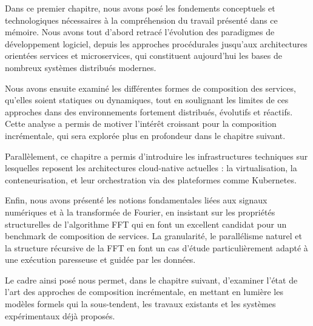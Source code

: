Dans ce premier chapitre, nous avons posé les fondements conceptuels et technologiques nécessaires à la compréhension du travail présenté dans ce mémoire. Nous avons tout d’abord retracé l’évolution des paradigmes de développement logiciel, depuis les approches procédurales jusqu’aux architectures orientées services et microservices, qui constituent aujourd’hui les bases de nombreux systèmes distribués modernes.

Nous avons ensuite examiné les différentes formes de composition des services, qu’elles soient statiques ou dynamiques, tout en soulignant les limites de ces approches dans des environnements fortement distribués, évolutifs et réactifs. Cette analyse a permis de motiver l’intérêt croissant pour la composition incrémentale, qui sera explorée plus en profondeur dans le chapitre suivant.

Parallèlement, ce chapitre a permis d’introduire les infrastructures techniques sur lesquelles reposent les architectures cloud-native actuelles : la virtualisation, la conteneurisation, et leur orchestration via des plateformes comme Kubernetes. %

Enfin, nous avons présenté les notions fondamentales liées aux signaux numériques et à la transformée de Fourier, en insistant sur les propriétés structurelles de l’algorithme FFT qui en font un excellent candidat pour un benchmark de composition de services. La granularité, le parallélisme naturel et la structure récursive de la FFT en font un cas d’étude particulièrement adapté à une exécution paresseuse et guidée par les données.

Le cadre ainsi posé nous permet, dans le chapitre suivant, d’examiner l’état de l’art des approches de composition incrémentale, en mettant en lumière les modèles formels qui la sous-tendent, les travaux existants et les systèmes expérimentaux déjà proposés.